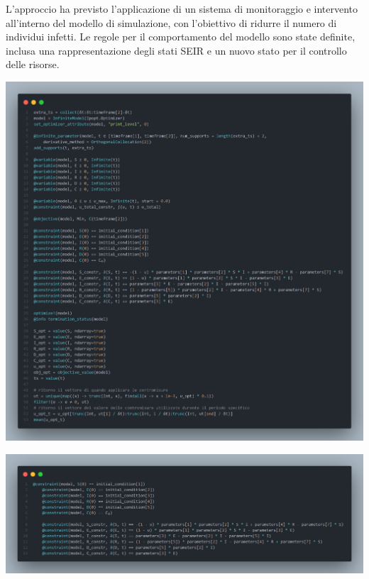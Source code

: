 L'approccio ha previsto l'applicazione di un sistema di 
monitoraggio e intervento all'interno del modello di simulazione, 
con l'obiettivo di ridurre il numero di individui infetti. 
Le regole per il comportamento del modello sono state definite, 
inclusa una rappresentazione degli stati SEIR e un nuovo stato per 
il controllo delle risorse.

\begin{minipage}{\linewidth}
	\centering
	\includegraphics[width=\textwidth]{img/controller_ipopt.png}
	\label{fig:controller_ipopt}
\end{minipage}

\begin{minipage}{\linewidth}
	\centering
	\includegraphics[width=\textwidth]{img/controller_rules.png}
	\label{fig:controller_rules}
\end{minipage}

